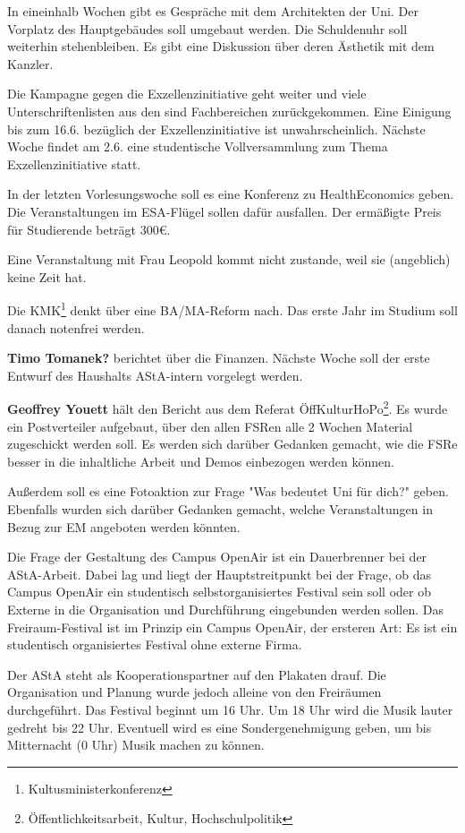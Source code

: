 \documentclass[ngerman,headheight=70pt]{scrartcl}
\begin{document}
    In eineinhalb Wochen gibt es Gespräche mit dem Architekten der Uni.
    Der Vorplatz des Hauptgebäudes soll umgebaut werden. Die Schuldenuhr soll
    weiterhin stehenbleiben. Es gibt eine Diskussion über deren Ästhetik mit dem
    Kanzler.

    Die Kampagne gegen die Exzellenzinitiative geht weiter und viele
    Unterschriftenlisten aus den sind Fachbereichen zurückgekommen. Eine Einigung
    bis zum 16.6. bezüglich der Exzellenzinitiative ist unwahrscheinlich. Nächste
    Woche findet am 2.6. eine studentische Vollversammlung zum Thema Exzellenzinitiative
    statt.

    In der letzten Vorlesungswoche soll es eine Konferenz zu HealthEconomics geben.
    Die Veranstaltungen im ESA-Flügel sollen dafür ausfallen. Der ermäßigte Preis
    für Studierende beträgt 300€.

    Eine Veranstaltung mit Frau Leopold kommt nicht zustande, weil sie (angeblich)
    keine Zeit hat.

    Die KMK\footnote{Kultusministerkonferenz} denkt über eine BA/MA-Reform nach.
    Das erste Jahr im Studium soll danach notenfrei werden.

    \textbf{Timo Tomanek?} berichtet über die Finanzen. Nächste Woche soll der
    erste Entwurf des Haushalts AStA-intern vorgelegt werden.

    \textbf{Geoffrey Youett} hält den Bericht aus dem Referat
    ÖffKulturHoPo\footnote{Öffentlichkeitsarbeit, Kultur, Hochschulpolitik}. Es
    wurde ein Postverteiler aufgebaut, über den allen FSRen alle 2 Wochen Material
    zugeschickt werden soll. Es werden sich darüber Gedanken gemacht, wie die FSRe
    besser in die inhaltliche Arbeit und Demos einbezogen werden können.

    Außerdem soll es eine Fotoaktion zur Frage "Was bedeutet Uni für dich?" geben.
    Ebenfalls wurden sich darüber Gedanken gemacht, welche Veranstaltungen in Bezug
    zur EM angeboten werden könnten.

    Die Frage der Gestaltung des Campus OpenAir ist ein Dauerbrenner bei der
    AStA-Arbeit. Dabei lag und liegt der Hauptstreitpunkt bei der Frage, ob das
    Campus OpenAir ein studentisch selbstorganisiertes Festival sein soll oder ob
    Externe in die Organisation und Durchführung eingebunden werden sollen.
    Das Freiraum-Festival ist im Prinzip ein Campus OpenAir, der ersteren Art:
    Es ist ein studentisch organisiertes Festival ohne externe Firma.

    Der AStA steht als Kooperationspartner auf den Plakaten drauf. Die Organisation
    und Planung wurde jedoch alleine von den Freiräumen durchgeführt. Das Festival
    beginnt um 16 Uhr. Um 18 Uhr wird die Musik lauter gedreht bis 22 Uhr. Eventuell
    wird es eine Sondergenehmigung geben, um bis Mitternacht (0 Uhr) Musik machen
    zu können.
\end{document}
